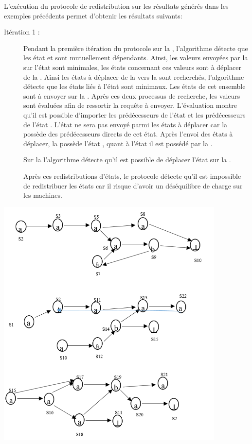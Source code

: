 \begin{Exemple}\label{ea5}
L'exécution du protocole de redistribution sur les résultats générés dans les exemples précédents permet d'obtenir  les résultats suivants:

\begin{description}
\item[Itération 1 :] Pendant la première itération du protocole sur la \mone{}, l'algorithme détecte que les état  et  sont mutuellement dépendants. Ainsi, les valeurs envoyées par la \mtwo{} sur l'état  sont minimales, les états concernant ces valeurs sont à déplacer de la \mtwo{}. Ainsi les états à déplacer de la \mone{} vers la \mtwo{} sont recherchés, l'algorithme détecte que les états liés à l'état  sont minimaux. Les états de cet ensemble sont à envoyer sur la \mtwo{}. Après ces deux processus de recherche, les valeurs sont évaluées afin de ressortir la requête à envoyer. L'évaluation montre qu'il est possible d'importer les prédécesseurs de l'état  et les prédécesseurs de  l'état .
L'état  ne sera pas envoyé parmi les états à déplacer car la \mtree{} possède des prédécesseurs directs de cet état. Après l'envoi des états à déplacer, la \mone{} possède l'état , quant à l'état  il est possédé par la \mtwo{}.


Sur la \mtree{} l'algorithme détecte qu'il est possible de déplacer l'état  sur la \mtwo{}.


   Après ces redistributions d'états, le protocole détecte qu'il est impossible de redistribuer les états car il risque d'avoir un déséquilibre de charge sur les machines.
   
\end{description}
\centering
	\includegraphics[height=5in]{img/Rskd.png}
	
\end{Exemple}
